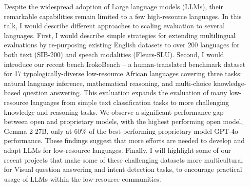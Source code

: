Despite the widespread adoption of Large language models (LLMs), their remarkable capabilities remain limited to a few high-resource languages. In this talk, I would describe different approaches to scaling evaluation to several languages. First, I would describe simple strategies for extending multilingual evaluations by re-purposing existing English datasets to over 200 languages for both text (SIB-200) and speech modalities (Fleurs-SLU). Second, I would introduce our recent bench IrokoBench -- a human-translated benchmark dataset for 17 typologically-diverse low-resource African languages covering three tasks: natural language inference, mathematical reasoning, and multi-choice knowledge-based question answering. This evaluation expands the evaluation of many low-resource languages from simple text classification tasks to more challenging knowledge and reasoning tasks. We observe a significant performance gap between open and proprietary models, with the highest performing open model, Gemma 2 27B, only at 60\% of the best-performing proprietary model GPT-4o performance. These findings suggest that more efforts are needed to develop and adapt LLMs for low-resource languages. Finally, I will highlight some of our recent projects that make some of these challenging datasets more multicultural for Visual question answering and intent detection tasks, to encourage practical usage of LLMs within the low-resource communities.